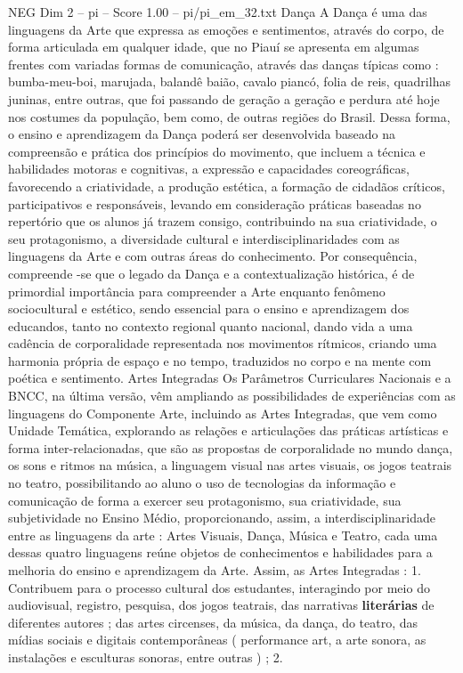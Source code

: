\begin{textsample}{NEG Dim 2 – pi – Score 1.00 – pi/pi\_em\_32.txt}
Dança A Dança é uma das linguagens da Arte que expressa as emoções e sentimentos, através do corpo, de forma articulada em qualquer idade, que no Piauí se apresenta em algumas frentes com variadas formas de comunicação, através das danças típicas como : bumba-meu-boi, marujada, balandê baião, cavalo piancó, folia de reis, quadrilhas juninas, entre outras, que foi passando de geração a geração e perdura até hoje nos costumes da população, bem como, de outras regiões do Brasil.
Dessa forma, o ensino e aprendizagem da Dança poderá ser desenvolvida baseado na compreensão e prática dos princípios do movimento, que incluem a técnica e habilidades motoras e cognitivas, a expressão e capacidades coreográficas, favorecendo a criatividade, a produção estética, a formação de cidadãos críticos, participativos e responsáveis, levando em consideração práticas baseadas no repertório que os alunos já trazem consigo, contribuindo na sua criatividade, o seu protagonismo, a diversidade cultural e interdisciplinaridades com as linguagens da Arte e com outras áreas do conhecimento.
Por consequência, compreende -se que o legado da Dança e a contextualização histórica, é de primordial importância para compreender a Arte enquanto fenômeno sociocultural e estético, sendo essencial para o ensino e aprendizagem dos educandos, tanto no contexto regional quanto nacional, dando vida a uma cadência de corporalidade representada nos movimentos rítmicos, criando uma harmonia própria de espaço e no tempo, traduzidos no corpo e na mente com poética e sentimento.
Artes Integradas Os Parâmetros Curriculares Nacionais e a BNCC, na última versão, vêm ampliando as possibilidades de experiências com as linguagens do Componente Arte, incluindo as Artes Integradas, que vem como Unidade Temática, explorando as relações e articulações das práticas artísticas e forma inter-relacionadas, que são as propostas de corporalidade no mundo dança, os sons e ritmos na música, a linguagem visual nas artes visuais, os jogos teatrais no teatro, possibilitando ao aluno o uso de tecnologias da informação e comunicação de forma a exercer seu protagonismo, sua criatividade, sua subjetividade no Ensino Médio, proporcionando, assim, a interdisciplinaridade entre as linguagens da arte : Artes Visuais, Dança, Música e Teatro, cada uma dessas quatro linguagens reúne objetos de conhecimentos e habilidades para a melhoria do ensino e aprendizagem da Arte.
Assim, as Artes Integradas : 1.
Contribuem para o processo cultural dos estudantes, interagindo por meio do audiovisual, registro, pesquisa, dos jogos teatrais, das narrativas \textbf{literárias} de diferentes autores ; das artes circenses, da música, da dança, do teatro, das mídias sociais e digitais contemporâneas ( performance art, a arte sonora, as instalações e esculturas sonoras, entre outras ) ; 2.

\end{textsample}

